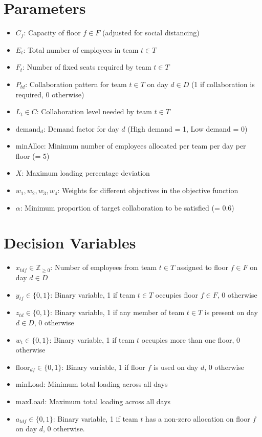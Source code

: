 \documentclass[12pt]{article}
\begin{document}
\section{Parameters}
\begin{itemize}
\item $C_f$: Capacity of floor $f \in F$ (adjusted for social distancing)
\item $E_t$: Total number of employees in team $t \in T$
\item $F_t$: Number of fixed seats required by team $t \in T$
\item $P_{td}$: Collaboration pattern for team $t \in T$ on day $d \in D$ (1 if collaboration is required, 0 otherwise)
\item $L_t \in C$: Collaboration level needed by team $t \in T$
\item $\text{demand}_d$: Demand factor for day $d$ (High demand = 1, Low demand = 0)
\item $\text{minAlloc}$: Minimum number of employees allocated per team per day per floor (= 5)
\item $X$: Maximum loading percentage deviation
\item $w_1, w_2, w_3, w_4$: Weights for different objectives in the objective function
\item $\alpha$: Minimum proportion of target collaboration to be satisfied (= 0.6)
\end{itemize}

\section{Decision Variables}
\begin{itemize}
\item $x_{tdf} \in \mathbb{Z}_{\geq 0}$: Number of employees from team $t \in T$ assigned to floor $f \in F$ on day $d \in D$
\item $y_{tf} \in \{0,1\}$: Binary variable, 1 if team $t \in T$ occupies floor $f \in F$, 0 otherwise
\item $z_{td} \in \{0,1\}$: Binary variable, 1 if any member of team $t \in T$ is present on day $d \in D$, 0 otherwise
\item $w_t \in \{0,1\}$: Binary variable, 1 if team $t$ occupies more than one floor, 0 otherwise
\item $\text{floor}_{df} \in \{0,1\}$: Binary variable, 1 if floor $f$ is used on day $d$, 0 otherwise
\item $\text{minLoad}$: Minimum total loading across all days
\item $\text{maxLoad}$: Maximum total loading across all days
\item $a_{tdf} \in \{0,1\}$: Binary variable, 1 if team $t$ has a non-zero allocation on floor $f$ on day $d$, 0 otherwise.
\end{itemize}
\end{document}
